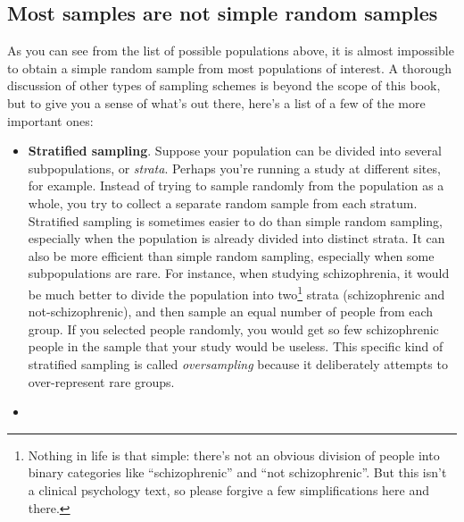 \documentclass[
  11pt,
  a4paper,
  twoside,symmetric,openright]{book}
\providecommand{\tightlist}{%
  \setlength{\itemsep}{0pt}\setlength{\parskip}{0pt}}
\theoremstyle{break}
\theoremstyle{break}
\begin{document}
\subsection{Most samples are not simple random samples}\label{most-samples-are-not-simple-random-samples}

As you can see from the list of possible populations above, it is almost impossible to obtain a simple random sample from most populations of interest. A thorough discussion of other types of sampling schemes is beyond the scope of this book, but to give you a sense of what's out there, here's a list of a few of the more important ones:

\begin{itemize}
\tightlist
\item
  \textbf{Stratified sampling}. Suppose your population can be divided into several subpopulations, or \emph{strata}. Perhaps you're running a study at different sites, for example. Instead of trying to sample randomly from the population as a whole, you try to collect a separate random sample from each stratum. Stratified sampling is sometimes easier to do than simple random sampling, especially when the population is already divided into distinct strata. It can also be more efficient than simple random sampling, especially when some subpopulations are rare. For instance, when studying schizophrenia, it would be much better to divide the population into two\footnote{Nothing in life is that simple: there's not an obvious division of people into binary categories like ``schizophrenic'' and ``not schizophrenic''. But this isn't a clinical psychology text, so please forgive a few simplifications here and there.} strata (schizophrenic and not-schizophrenic), and then sample an equal number of people from each group. If you selected people randomly, you would get so few schizophrenic people in the sample that your study would be useless. This specific kind of stratified sampling is called \emph{oversampling} because it deliberately attempts to over-represent rare groups.
\item

\end{itemize}
\end{document}

